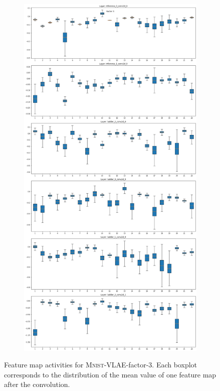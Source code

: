 \begin{figure}
    \centering
    \begin{subfigure}{\textwidth}
        \centering
        \includegraphics[height=.8\textheight]{images/sparseness/encoder_fm3_fms.png}
    \end{subfigure}
    \caption[\textsc{Mnist}-VLAE-factor-3: Feature Map Activites]{Feature map activities for \textsc{Mnist}-\ac{VLAE}-factor-3.
    Each boxplot corresponds to the distribution of the mean value of one feature map after the convolution.
    }
    \label{fig:fm_activities_sparseness}
\end{figure}
